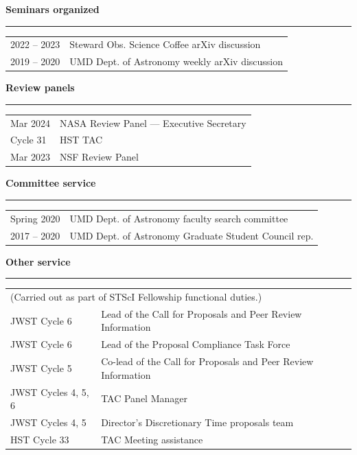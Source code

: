 \documentclass[11pt]{article}
\makeatletter
\def\vhrulefill#1{\leavevmode\leaders\hrule \@height #1\hfill \kern\z@}
\newcommand{\subsectionname}[1]{{\large\bf #1 \vhrulefill{0.5pt}}}
\makeatother
\begin{document}
\subsectionname{Seminars organized}\vspace{-6pt}
\begin{longtable}{p{}p{}}
2022 -- 2023 & Steward Obs. Science Coffee arXiv discussion \\
2019 -- 2020 & UMD Dept. of Astronomy weekly arXiv discussion \medskip\\
\end{longtable}\vspace{-18pt}

\subsectionname{Review panels}\vspace{-6pt}
\begin{longtable}{p{}p{}}
Mar 2024 & NASA Review Panel --- Executive Secretary\\
Cycle 31 & HST TAC\\
Mar 2023 & NSF Review Panel\medskip \\
\end{longtable}\vspace{-18pt}


\subsectionname{Committee service}\vspace{-6pt}
\begin{longtable}{p{}p{}}
Spring 2020 & UMD Dept. of Astronomy faculty search committee \\
2017 -- 2020 & UMD Dept. of Astronomy Graduate Student Council rep. \medskip\\
\end{longtable}\vspace{-18pt}

\subsectionname{Other service}\vspace{-6pt}
\begin{longtable}{p{}p{}}
\multicolumn{2}{l}{\small (Carried out as part of STScI Fellowship functional duties.)}\\
JWST Cycle 6 & Lead of the Call for Proposals and Peer Review Information\\
JWST Cycle 6 & Lead of the Proposal Compliance Task Force\\
JWST Cycle 5 & Co-lead of the Call for Proposals and Peer Review Information\\
JWST Cycles 4, 5, 6 & TAC Panel Manager\\
JWST Cycles 4, 5 &  Director's Discretionary Time proposals team\\
HST Cycle 33 & TAC Meeting assistance\medskip\\
\end{longtable}\vspace{-18pt}
\end{document}
